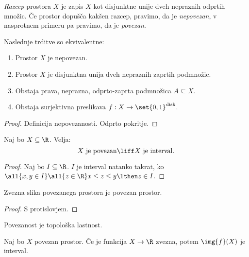 \begin{definicija}
    \emph{Razcep} prostora $X$ je zapis $X$ kot disjunktne unije dveh nepraznih odprtih množic. Če prostor dopušča kakšen razcep, pravimo, da je \emph{nepovezan}, v nasprotnem primeru pa pravimo, da je \emph{povezan}.
\end{definicija}

\begin{trditev}
    Naslednje trditve so ekvivalentne:
    \begin{enumerate}
        \item Prostor $X$ je nepovezan.
        \item Prostor $X$ je disjunktna unija dveh nepraznih zaprtih podmnožic.
        \item Obstaja prava, neprazna, odprto-zaprta podmnožica $A \subseteq X$.
        \item Obstaja surjektivna preslikava $f: X \to \set{0,1}^\text{disk}$. 
    \end{enumerate}
\end{trditev}

\begin{proof}
    Definicija nepovezanosti. Odprto pokritje.
\end{proof}

\begin{izrek}
    Naj bo $X \subseteq \R$. Velja: $$X \text{ je povezan} \liff X \text{ je interval}.$$
\end{izrek}

\begin{proof}
    Naj bo $I \subseteq \R$. $I$ je interval natanko takrat, ko $\all{x,y \in I} \all{z \in \R}x \leq z \leq y \lthen z \in I$.
\end{proof}

\begin{izrek}
    Zvezna slika povezanega prostora je povezan prostor.
\end{izrek}

\begin{proof}
    S protislovjem.
\end{proof}

\begin{opomba}
    Povezanost je topološka lastnost.
\end{opomba}

\begin{izrek}
    Naj bo $X$ povezan prostor. Če je funkcija $X \to \R$ zvezna, potem $\img{f}(X)$ je interval.
\end{izrek}

